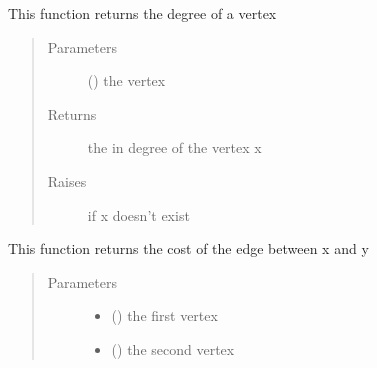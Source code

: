 \documentclass[letterpaper,10pt,english]{sphinxmanual}
\begin{document}
\begin{fulllineitems}
\begin{fulllineitems}
\end{fulllineitems}


\begin{fulllineitems}
\label{\detokenize{UndirectedGraph:UndirectedGraph.UndirectedGraph.get_degree}}
This function returns the degree of a vertex
\begin{quote}\begin{description}
\item[{Parameters}] \leavevmode
{} () \textendash{} the vertex

\item[{Returns}] \leavevmode
the in degree of the vertex x

\item[{Raises}] \leavevmode
{} \textendash{} if x doesn’t exist

\end{description}\end{quote}

\end{fulllineitems}


\begin{fulllineitems}
\label{\detokenize{UndirectedGraph:UndirectedGraph.UndirectedGraph.get_edge_cost}}
This function returns the cost of the edge between x and y
\begin{quote}\begin{description}
\item[{Parameters}] \leavevmode\begin{itemize}
\item {} 
 () \textendash{} the first vertex

\item {} 
 () \textendash{} the second vertex


\end{itemize}
\end{description}
\end{quote}
\end{fulllineitems}
\end{fulllineitems}
\end{document}
